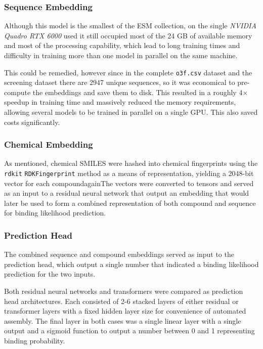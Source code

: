 \documentclass{article}
\begin{document}
\subsubsection{Sequence Embedding}


Although this model is the smallest of the ESM collection, on the single \textit{NVIDIA Quadro RTX 6000} used it still occupied most of the 24 GB of available memory and most of the processing capability, which lead to long training times and difficulty in training more than one model in parallel on the same machine.

This could be remedied, however since in the complete \texttt{o3f.csv} dataset and the screening dataset there are 2947 unique sequences, so it was economical to pre-compute the embeddings and save them to disk.
This resulted in a roughly 4$\times$ speedup in training time and massively reduced the memory requirements, allowing several models to be trained in parallel on a single GPU.
This also saved costs significantly.

\subsubsection{Chemical Embedding}

As mentioned, chemical SMILES were hashed into chemical fingerprints using the \texttt{rdkit} \texttt{RDKFingerprint} method as a means of representation, yielding a 2048-bit vector for each compoundagainThe vectors were converted to tensors and served as an input to a residual neural network that output an embedding that would later be used to form a combined representation of both compound and sequence for binding likelihood prediction.

\subsubsection{Prediction Head}

The combined sequence and compound embeddings served as input to the prediction head, which output a single number that indicated a binding likelihood prediction for the two inputs.

Both residual neural networks and transformers were compared as prediction head architectures.
Each consisted of 2-6 stacked layers of either residual or transformer layers with a fixed hidden layer size for convenience of automated assembly.
The final layer in both cases was a single linear layer with a single output and a sigmoid function to output a number between 0 and 1 representing binding probability.
\end{document}
